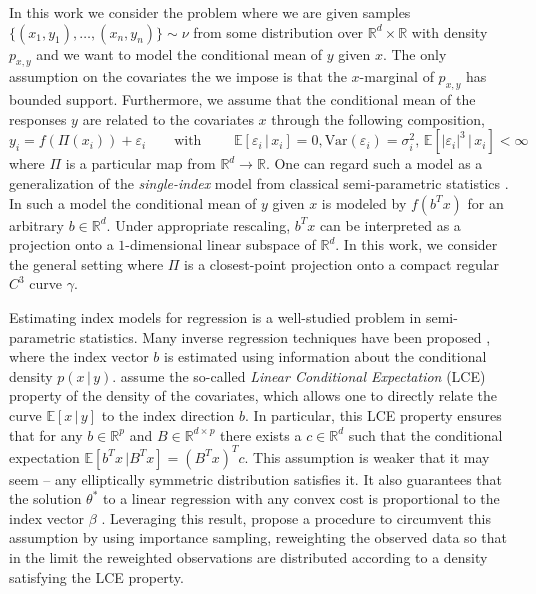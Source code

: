 \documentclass[11pt]{article}
\begin{document}
In this work we consider the problem where we are given samples $\{(x_1, y_1), \dots, (x_n, y_n)\} \sim \nu$ from some distribution over $\mathbb{R}^d\times \mathbb{R}$ with density $p_{x,y}$ and we want to model the conditional mean of $y$ given $x$. The only assumption on the covariates the we impose is that the $x$-marginal of $p_{x,y}$ has bounded support. Furthermore, we assume that the conditional mean of the responses $y$ are related to the covariates $x$ through the following composition,
\begin{equation}
    y_i = f(\Pi(x_i)) + \varepsilon_i \qquad \text{with } \qquad \mathbb{E}[\varepsilon_i \, | \, x_i] = 0, \text{Var}(\varepsilon_i) = \sigma^2_i,\, \mathbb{E}[|\varepsilon_i|^3 \, |\, x_i] < \infty \label{eq: the model}
\end{equation}
where $\Pi$ is a particular map from $\mathbb{R}^d \rightarrow \mathbb{R}$. One can regard such a model as a generalization of the \textit{single-index} model from classical semi-parametric statistics \cite{gyorfi2002distribution}. In such a model the conditional mean of $y$ given $x$ is modeled by $f(b^Tx)$ for an arbitrary $b\in \mathbb{R}^d$. Under appropriate rescaling, $b^Tx$ can be interpreted as a projection onto a $1$-dimensional linear subspace of $\mathbb{R}^d$. In this work, we consider the general setting where $\Pi$ is a closest-point projection onto a compact regular $C^3$ curve $\gamma$.

Estimating index models for regression is a well-studied problem in semi-parametric statistics. Many inverse regression techniques have been proposed \cite{li1991sliced, li2005contour, li2007directional, dennis2000save}, where the index vector $b$ is estimated using information about the conditional density $p(x \, |\, y)$. \citet{li1991sliced} assume the so-called \textit{Linear Conditional Expectation} (LCE) property of the density of the covariates, which allows one to directly relate the curve $\mathbb{E}[x\,|\,y]$ to the index direction $b$. In particular, this LCE property ensures that for any $b \in \mathbb{R}^p$ and $B \in \mathbb{R}^{d\times p}$ there exists a $c \in \mathbb{R}^d$ such that the conditional expectation $\mathbb{E}[b^{T}x \, | B^{T}x] = (B^{T}x)^T c$. This assumption is weaker that it may seem -- any elliptically symmetric distribution satisfies it. It also guarantees that the solution $\theta^*$ to a linear regression with any convex cost is proportional to the index vector $\beta$ \cite{li1989regression}. Leveraging this result, \citet{Newey_Ruud_2005} propose a procedure to circumvent this assumption by using importance sampling, reweighting the observed data so that in the limit the reweighted observations are distributed according to a density satisfying the LCE property. 
\end{document}
